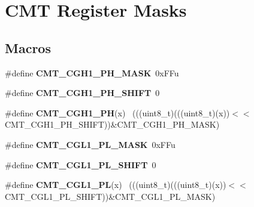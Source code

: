 \hypertarget{group___c_m_t___register___masks}{}\section{C\+M\+T Register Masks}
\label{group___c_m_t___register___masks}
\subsection*{Macros}
\begin{DoxyCompactItemize}
\item 
\hypertarget{group___c_m_t___register___masks_ga4ca405c6721e302fabcb4ddcc7773f1a}{}\#define {\bfseries C\+M\+T\+\_\+\+C\+G\+H1\+\_\+\+P\+H\+\_\+\+M\+A\+S\+K}~0x\+F\+Fu\label{group___c_m_t___register___masks_ga4ca405c6721e302fabcb4ddcc7773f1a}

\item 
\hypertarget{group___c_m_t___register___masks_ga6021b3f0f356c06b50371a28bf83f27e}{}\#define {\bfseries C\+M\+T\+\_\+\+C\+G\+H1\+\_\+\+P\+H\+\_\+\+S\+H\+I\+F\+T}~0\label{group___c_m_t___register___masks_ga6021b3f0f356c06b50371a28bf83f27e}

\item 
\hypertarget{group___c_m_t___register___masks_ga80e8f906e7d14d8372f22abfc9138b97}{}\#define {\bfseries C\+M\+T\+\_\+\+C\+G\+H1\+\_\+\+P\+H}(x)                                                  ~(((uint8\+\_\+t)(((uint8\+\_\+t)(x))$<$$<$C\+M\+T\+\_\+\+C\+G\+H1\+\_\+\+P\+H\+\_\+\+S\+H\+I\+F\+T))\&C\+M\+T\+\_\+\+C\+G\+H1\+\_\+\+P\+H\+\_\+\+M\+A\+S\+K)\label{group___c_m_t___register___masks_ga80e8f906e7d14d8372f22abfc9138b97}

\item 
\hypertarget{group___c_m_t___register___masks_gab1d6a610e9cc0a024160f157f48a851f}{}\#define {\bfseries C\+M\+T\+\_\+\+C\+G\+L1\+\_\+\+P\+L\+\_\+\+M\+A\+S\+K}~0x\+F\+Fu\label{group___c_m_t___register___masks_gab1d6a610e9cc0a024160f157f48a851f}

\item 
\hypertarget{group___c_m_t___register___masks_gaa7bf093c1ef1bfd7e40a2740eafb093d}{}\#define {\bfseries C\+M\+T\+\_\+\+C\+G\+L1\+\_\+\+P\+L\+\_\+\+S\+H\+I\+F\+T}~0\label{group___c_m_t___register___masks_gaa7bf093c1ef1bfd7e40a2740eafb093d}

\item 
\hypertarget{group___c_m_t___register___masks_ga44c85b7bf2d25219997d1205e1f4ec9a}{}\#define {\bfseries C\+M\+T\+\_\+\+C\+G\+L1\+\_\+\+P\+L}(x)                                                  ~(((uint8\+\_\+t)(((uint8\+\_\+t)(x))$<$$<$C\+M\+T\+\_\+\+C\+G\+L1\+\_\+\+P\+L\+\_\+\+S\+H\+I\+F\+T))\&C\+M\+T\+\_\+\+C\+G\+L1\+\_\+\+P\+L\+\_\+\+M\+A\+S\+K)\label{group___c_m_t___register___masks_ga44c85b7bf2d25219997d1205e1f4ec9a}


\end{DoxyCompactItemize}
